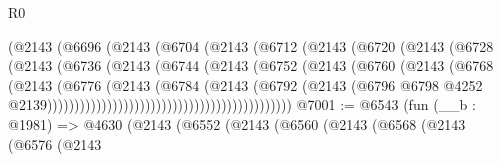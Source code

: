 \begin{lexlean}{R0}
\begin{coremodule}
                                      (@2143
                                        (@6696
                                          (@2143
                                            (@6704
                                              (@2143
                                                (@6712
                                                  (@2143
                                                    (@6720
                                                      (@2143
                                                        (@6728
                                                          (@2143
                                                            (@6736
                                                              (@2143
                                                                (@6744
                                                                  (@2143
                                                                    (@6752
                                                                      (@2143
                                                                        (@6760
                                                                          (@2143
                                                                            (@6768
                                                                              (@2143
                                                                                (@6776
                                                                                  (@2143
                                                                                    (@6784
                                                                                      (@2143
                                                                                        (@6792
                                                                                          (@2143
                                                                                            (@6796
                                                                                              @6798
                                                                                              @4252
                                                                                              @2139)))))))))))))))))))))))))))))))))))))))))))))
@7001 := @6543
    (fun (__b : @1981) =>
    @4630
      (@2143
        (@6552
          (@2143
            (@6560
              (@2143
                (@6568
                  (@2143
                    (@6576
                      (@2143

\end{coremodule}
\end{lexlean}

